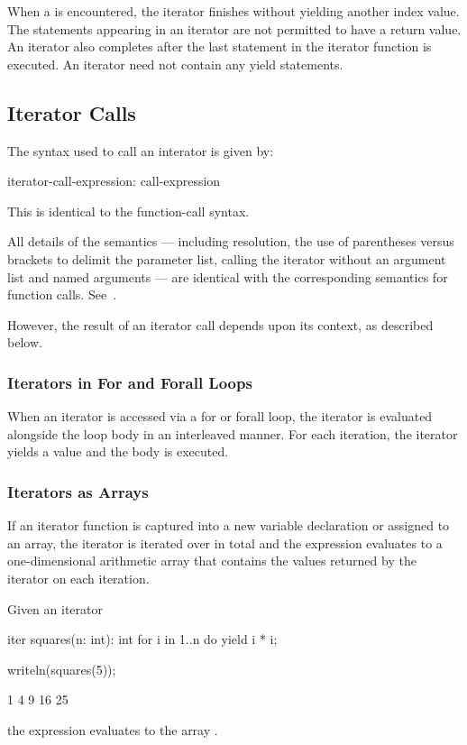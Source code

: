 When a  is encountered, the iterator finishes without yielding another
index value.  The  statements appearing in an iterator are not
permitted to have a return value.
An iterator also completes after the last
statement in the iterator function is executed.
An iterator need not contain any yield statements.

\subsection{Iterator Calls}
\label{Iterator_Calls}

The syntax used to call an interator is given by:
\begin{syntax}
iterator-call-expression:
  call-expression
\end{syntax}
This is identical to the function-call syntax.

All details of the  semantics --- including
resolution, the use of parentheses versus brackets to delimit the parameter
list, calling the iterator without an argument list and named arguments ---
are identical with the corresponding semantics for function calls.
See~.

However, the result of an iterator call depends upon its context, as described below.

\subsubsection{Iterators in For and Forall Loops}
\label{Iterators_in_For_and_Forall_Loops}

When an iterator is accessed via a for or forall loop, the iterator is
evaluated alongside the loop body in an interleaved manner.  For each
iteration, the iterator yields a value and the body is executed.

\subsubsection{Iterators as Arrays}
\label{Iterators_as_Arrays}

If an iterator function is captured into a new variable declaration or
assigned to an array, the iterator is iterated over in total and the
expression evaluates to a one-dimensional arithmetic array that
contains the values returned by the iterator on each iteration.
\begin{example}
Given an iterator
\begin{chapel}
iter squares(n: int): int {
  for i in 1..n do
    yield i * i;
}
\end{chapel}
\begin{chapelpost}
writeln(squares(5));
\end{chapelpost}
\begin{chapeloutput}
1 4 9 16 25
\end{chapeloutput}
the expression  evaluates to the array .
\end{example}

